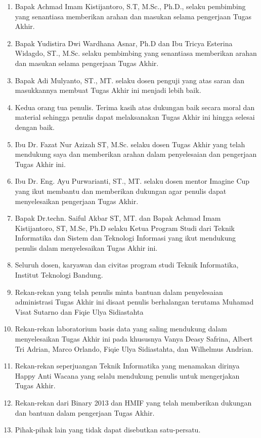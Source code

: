 \begin{enumerate}
	\item Bapak Achmad Imam Kistijantoro, S.T, M.Sc., Ph.D., selaku pembimbing yang senantiasa memberikan arahan dan masukan selama pengerjaan Tugas Akhir.
	\item Bapak Yudistira Dwi Wardhana Asnar, Ph.D dan Ibu Tricya Esterina Widagdo, ST., M.Sc. selaku pembimbing yang senantiasa memberikan arahan dan masukan selama pengerjaan Tugas Akhir.
	\item Bapak Adi Mulyanto, ST., MT. selaku dosen penguji yang atas saran dan masukkannya membuat Tugas Akhir ini menjadi lebih baik.
	\item Kedua orang tua penulis. Terima kasih atas dukungan baik secara moral dan material sehingga penulis dapat melaksanakan Tugas Akhir ini hingga selesai dengan baik.
	\item Ibu Dr. Fazat Nur Azizah ST, M.Sc. selaku dosen Tugas Akhir yang telah mendukung saya dan memberikan arahan dalam penyelesaian dan pengerjaan Tugas Akhir ini.
	\item Ibu Dr. Eng. Ayu Purwarianti, ST., MT. selaku dosen mentor Imagine Cup yang ikut membantu dan memberikan dukungan agar penulis dapat menyelesaikan pengerjaan Tugas Akhir.
	\item Bapak Dr.techn. Saiful Akbar ST, MT. dan Bapak Achmad Imam Kistijantoro, ST, M.Sc, Ph.D selaku Ketua Program Studi dari Teknik Informatika dan Sistem dan Teknologi Informasi yang ikut mendukung penulis dalam menyelesaikan Tugas Akhir ini.
	\item Seluruh dosen, karyawan dan civitas program studi Teknik Informatika, Institut Teknologi Bandung.
	\item Rekan-rekan yang telah penulis minta bantuan dalam penyelesaian administrasi Tugas Akhir ini disaat penulis berhalangan terutama Muhamad Visat Sutarno dan Fiqie Ulya Sidiastahta
	\item Rekan-rekan laboratorium basis data yang saling mendukung dalam menyelesaikan Tugas Akhir ini pada khususnya Vanya Deasy Safrina, Albert Tri Adrian, Marco Orlando, Fiqie Ulya Sidiastahta, dan Wilhelmus Andrian.
	\item Rekan-rekan seperjuangan Teknik Informatika yang menamakan dirinya Happy Anti Wacana yang selalu mendukung penulis untuk mengerjakan Tugas Akhir.
	\item Rekan-rekan dari Binary 2013 dan HMIF yang telah memberikan dukungan dan bantuan dalam pengerjaan Tugas Akhir.
	\item Pihak-pihak lain yang tidak dapat disebutkan satu-persatu.
\end{enumerate}

